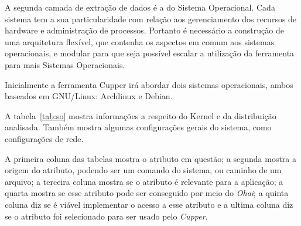 A segunda camada de extração de dados é a do Sistema Operacional. 
Cada sistema tem a sua particularidade com relação aos gerenciamento dos 
recursos de hardware e administração de processos. Portanto é necessário a 
construção de uma arquitetura flexível, que contenha os aspectos em comum aos
sistemas operacionais, e modular para que seja possível escalar a utilização 
da ferramenta para mais Sistemas Operacionais.

Inicialmente a ferramenta Cupper irá abordar dois sistemas operacionais, 
ambos baseados em GNU/Linux: Archlinux e Debian.

A tabela~\ref{tab:so} mostra informações a respeito do Kernel e da distribuição
analisada. Também mostra algumas configurações gerais do sistema, como
configurações de rede.

A primeira coluna das tabelas mostra o atributo em questão; a segunda mostra
a origem do atributo, podendo ser um comando do sistema, ou caminho de um arquivo;
a terceira coluna mostra se o atributo é relevante para a aplicação; a quarta mostra se
esse atributo pode ser conseguido por meio do \textit{Ohai}; a quinta coluna 
diz se é viável implementar o acesso a esse atributo e a ultima coluna
diz se o atributo foi selecionado para ser usado pelo \textit{Cupper}.

